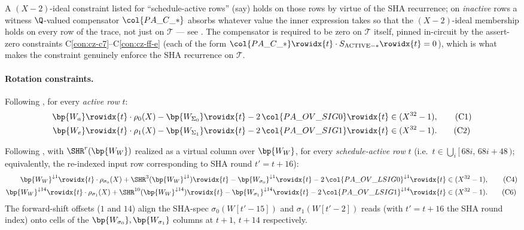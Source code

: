 A $(X-2)$-ideal constraint listed for ``schedule-active rows''
(say) holds on those rows by virtue of the SHA recurrence; on
\emph{inactive} rows a witness $\Q$-valued compensator
$\col{PA\_C\_*}$ absorbs whatever value the inner expression takes
so that the $(X-2)$-ideal membership holds on every row of the
trace, not just on $\mathcal{T}$ — see .
The compensator is required to be zero on $\mathcal{T}$ itself,
pinned in-circuit by the assert-zero constraints
C\ref{con:cz-c7}--C\ref{con:cz-ff-e} (each of the form
$\col{PA\_C\_*}\rowidx{t} \cdot S_{\mathrm{ACTIVE-*}}\rowidx{t} = 0$),
which is what makes the constraint genuinely enforce the SHA
recurrence on $\mathcal{T}$.

\paragraph{Rotation constraints.}

Following , for every \emph{active row} $t$:
\begin{align}
\bp{W_a}\rowidx{t} \cdot \rho_{0}(X) - \bp{W_{\Sigma_0}}\rowidx{t} - 2\,\col{PA\_OV\_SIG0}\rowidx{t} &\in (X^{32}-1), \tag{C1}\label{con:c1}\\
\bp{W_e}\rowidx{t} \cdot \rho_{1}(X) - \bp{W_{\Sigma_1}}\rowidx{t} - 2\,\col{PA\_OV\_SIG1}\rowidx{t} &\in (X^{32}-1). \tag{C2}\label{con:c2}
\end{align}

Following , with $\SHR^{r}(\bp{W_W})$ realized
as a virtual column over $\bp{W_W}$, for every \emph{schedule-active row}
$t$ (i.e.\ $t \in \bigcup_i [\,68i,\,68i+48\,)$; equivalently, the
re-indexed input row corresponding to SHA round $t' = t + 16$):
\begin{align}
\bp{W_W}^{\downarrow 1}\rowidx{t} \cdot \rho_{\sigma_0}(X) + \SHR^{3}(\bp{W_W}^{\downarrow 1})\rowidx{t}
   - \bp{W_{\sigma_0}}^{\downarrow 1}\rowidx{t} - 2\,\col{PA\_OV\_LSIG0}^{\downarrow 1}\rowidx{t} &\in (X^{32}-1), \tag{C4}\label{con:c4}\\
\bp{W_W}^{\downarrow 14}\rowidx{t} \cdot \rho_{\sigma_1}(X) + \SHR^{10}(\bp{W_W}^{\downarrow 14})\rowidx{t}
   - \bp{W_{\sigma_1}}^{\downarrow 14}\rowidx{t} - 2\,\col{PA\_OV\_LSIG1}^{\downarrow 14}\rowidx{t} &\in (X^{32}-1). \tag{C6}\label{con:c6}
\end{align}
The forward-shift offsets ($1$ and $14$) align the SHA-spec
$\sigma_0(W[t'-15])$ and $\sigma_1(W[t'-2])$ reads (with
$t' = t + 16$ the SHA round index) onto cells of the
$\bp{W_{\sigma_0}}, \bp{W_{\sigma_1}}$ columns at $t + 1$, $t + 14$
respectively.

